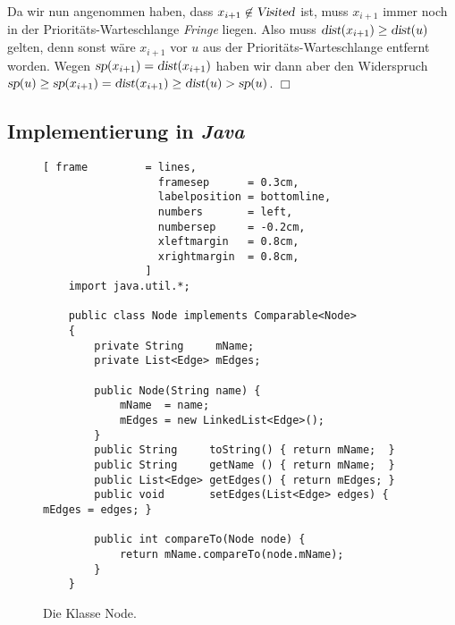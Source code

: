 \begin{enumerate}
      Da wir nun angenommen haben, dass $x_{i+1} \not\in \textsl{Visited}$ ist,
      muss $x_{i+1}$ immer noch in der Pri\-ori\-t\"ats-Warteschlange \textsl{Fringe} liegen.
      Also muss $\textsl{dist}(x_{i+1}) \geq \textsl{dist}(u)$ gelten,
      denn sonst w\"are $x_{i+1}$ vor $u$ aus der Priorit\"ats-Warteschlange entfernt worden.
      Wegen $\textsl{sp}(x_{i+1}) = \textsl{dist}(x_{i+1})$ haben wir dann aber
      den Widerspruch 
      \\[0.2cm]
      \hspace*{1.3cm} 
      $\textsl{sp}(u) \geq \textsl{sp}(x_{i+1}) = \textsl{dist}(x_{i+1}) \geq
      \textsl{dist}(u) > \textsl{sp}(u)$.
      \hspace*{\fill} $\Box$
\end{enumerate}

\subsection{Implementierung in \textsl{Java}}
\begin{figure}[!ht]
\centering
\begin{Verbatim}[ frame         = lines, 
                  framesep      = 0.3cm, 
                  labelposition = bottomline,
                  numbers       = left,
                  numbersep     = -0.2cm,
                  xleftmargin   = 0.8cm,
                  xrightmargin  = 0.8cm,
                ]
    import java.util.*;
    
    public class Node implements Comparable<Node>
    {
        private String     mName;
        private List<Edge> mEdges;
    
        public Node(String name) {
            mName  = name;
            mEdges = new LinkedList<Edge>();
        }   
        public String     toString() { return mName;  }
        public String     getName () { return mName;  }
        public List<Edge> getEdges() { return mEdges; }
        public void       setEdges(List<Edge> edges) { mEdges = edges; }
            
        public int compareTo(Node node) {
            return mName.compareTo(node.mName);
        }
    }
\end{Verbatim}
\vspace*{-0.3cm}
\caption{Die Klasse Node.}
\label{fig:Graph/Node.java}
\end{figure}

